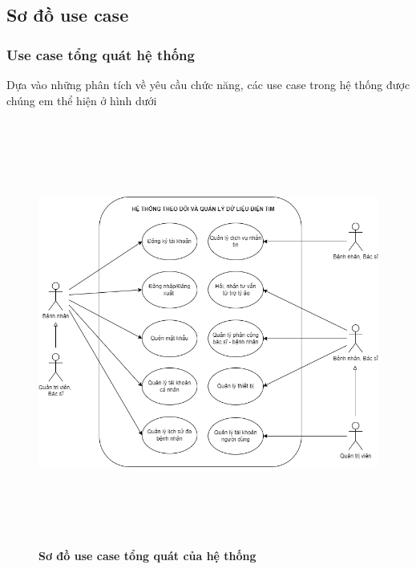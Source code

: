 \subsection{Sơ đồ use case}
\subsubsection{Use case tổng quát hệ thống}
Dựa vào những phân tích về yêu cầu chức năng, các use case trong hệ thống được chúng em thể hiện ở hình dưới 

  \begin{figure}[H]
    \centering
    \includegraphics[width=16cm,height=14cm]{Images/use_case/use_case_general.png}
    \caption[Sơ đồ use case tổng quát của hệ thống]{\bfseries \fontsize{12pt}{0pt}
    \selectfont Sơ đồ use case tổng quát của hệ thống}
    \label{use_case_general} %
  \end{figure}

